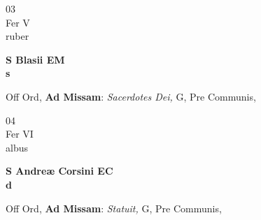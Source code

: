 \documentclass[10pt, openany]{book}
\begin{document}
        \begin{center}
            \begin{minipage}{3.5in}
                \vspace{2em}
                \begin{minipage}{0.5in}
                    {\Huge 03} \\
                    {\normalsize Fer V} \\
                    {\normalsize ruber}
                \end{minipage}
                \begin{minipage}{3.0in}
                    \textbf{ \large S Blasii EM \\
                    \textnormal{\normalsize s}} \\ 
                \end{minipage}
                \begin{justify}Off Ord, \textbf{Ad Missam}: \textit{Sacerdotes Dei,} G, Pre Communis,  
                \end{justify}
            \end{minipage}
        \end{center}
    
        \begin{center}
            \begin{minipage}{3.5in}
                \vspace{2em}
                \begin{minipage}{0.5in}
                    {\Huge 04} \\
                    {\normalsize Fer VI} \\
                    {\normalsize albus}
                \end{minipage}
                \begin{minipage}{3.0in}
                    \textbf{ \large S Andreæ Corsini EC \\
                    \textnormal{\normalsize d}} \\ 
                \end{minipage}
                \begin{justify}Off Ord, \textbf{Ad Missam}: \textit{Statuit,} G, Pre Communis,  
                \end{justify}
            \end{minipage}
        \end{center}
    
\end{document}
